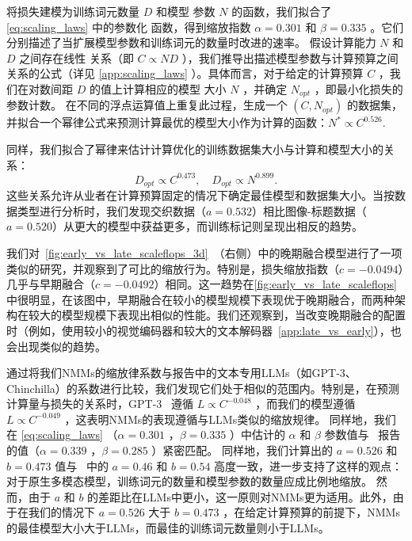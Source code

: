 将损失建模为训练词元数量 $D$ 和模型 参数 $N$ 的函数，我们拟合了 \cref{eq:scaling_laws} 中的参数化 函数，得到缩放指数 $\alpha = 0.301$ 和 $\beta = 0.335$ 。它们分别描述了当扩展模型参数和训练词元的数量时改进的速率。
假设计算能力 $N$ 和 $D$ 之间存在线性 关系（即 $C \propto ND$ ），我们推导出描述模型参数与计算预算之间关系的公式（详见 \cref{app:scaling_laws} ）。具体而言，对于给定的计算预算 $C$ ，我们在对数间距 $D$ 的值上计算相应的模型 大小 $N$ ，并确定 $N_{opt}$ ，即最小化损失的参数计数。
在不同的浮点运算值上重复此过程，生成一个 $(C,
N_{opt})$ 的数据集，并拟合一个幂律公式来预测计算最优的模型大小作为计算的函数：$N^* \propto C^{0.526}.$ 

同样，我们拟合了幂律来估计计算优化的训练数据集大小与计算和模型大小的关系：  
\[
D_{opt} \propto C^{0.473}, \quad D_{opt} \propto N^{0.899}.
\]  
这些关系允许从业者在计算预算固定的情况下确定最佳模型和数据集大小。当按数据类型进行分析时，我们发现交织数据（$a=0.532$）相比图像-标题数据（$a=0.520$）从更大的模型中获益更多，而训练标记则呈现出相反的趋势。  







我们对~\cref{fig:early_vs_late_scaleflops_3d}~（右侧）中的晚期融合模型进行了一项类似的研究，并观察到了可比的缩放行为。特别是，损失缩放指数（$c = -0.0494$）几乎与早期融合（$c = -0.0492$）相同。这一趋势在\cref{fig:early_vs_late_scaleflops}中很明显，在该图中，早期融合在较小的模型规模下表现优于晚期融合，而两种架构在较大的模型规模下表现出相似的性能。我们还观察到，当改变晚期融合的配置时（例如，使用较小的视觉编码器和较大的文本解码器~\cref{app:late_vs_early}），也会出现类似的趋势。


\begin{figure}[t!]
    \begin{minipage}[t]{0.48\textwidth}
        
    \end{minipage}        
    \hfill
    \begin{minipage}[t]{0.48\textwidth}
        
    \end{minipage}
\end{figure}



通过将我们NMMs的缩放律系数与报告中的文本专用LLMs（如GPT-3、Chinchilla）的系数进行比较，我们发现它们处于相似的范围内。特别是，在预测计算量与损失的关系时，GPT-3~\citep{brown2020language} 遵循 $L \propto C^{-0.048}$ ，而我们的模型遵循 $L \propto C^{-0.049}$ ，这表明NMMs的表现遵循与LLMs类似的缩放规律。
同样地，我们在 \cref{eq:scaling_laws} （$\alpha=0.301$ ，$\beta=0.335$ ）中估计的 $\alpha$ 和 $\beta$ 参数值与~\citet{hoffmann2022training} 报告的值（$\alpha=0.339$ ，$\beta=0.285$ ）紧密匹配。
同样地，我们计算出的 $a=0.526$ 和 $b=0.473$ 值与~\citet{hoffmann2022training} 中的 $a=0.46$ 和 $b=0.54$ 高度一致，进一步支持了这样的观点：对于原生多模态模型，训练词元的数量和模型参数的数量应成比例地缩放。
然而，由于 $a$ 和 $b$ 的差距比在LLMs中更小，这一原则对NMMs更为适用。此外，由于在我们的情况下 $a=0.526$ 大于 $b=0.473$ ，在给定计算预算的前提下，NMMs的最佳模型大小大于LLMs，而最佳的训练词元数量则小于LLMs。 



